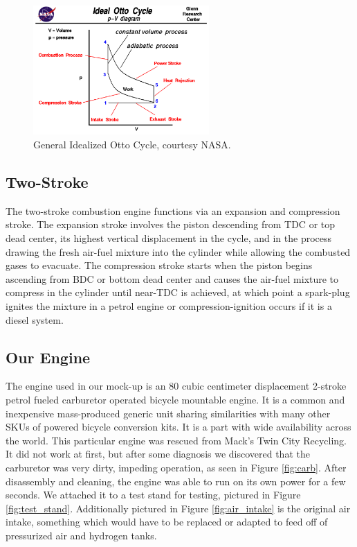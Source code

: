 \documentclass[conf]{new-aiaa}
\begin{document}
\begin{figure}[H]
    \centering
    \includegraphics[width=0.6\textwidth]{Screenshot 2023-04-24 170054.png}
    \caption{General Idealized Otto Cycle, courtesy NASA.\cite{nasa_otto}}
    \label{fig:otto_cycle}
\end{figure}


\subsection{Two-Stroke}
The two-stroke combustion engine functions via an expansion and compression stroke.  The expansion stroke involves the piston descending from TDC or top dead center, its highest vertical displacement in the cycle, and in the process drawing the fresh air-fuel mixture into the cylinder while allowing the combusted gases to evacuate.  The compression stroke starts when the piston begins ascending from BDC or bottom dead center and causes the air-fuel mixture to compress in the cylinder until near-TDC is achieved, at which point a spark-plug ignites the mixture in a petrol engine or compression-ignition occurs if it is a diesel system.
\subsection{Our Engine}

The engine used in our mock-up is an 80 cubic centimeter displacement 2-stroke petrol fueled carburetor operated bicycle mountable engine.  It is a common and inexpensive mass-produced generic unit sharing similarities with many other SKUs of powered bicycle conversion kits. It is a part with wide availability across the world. This particular engine was rescued from Mack's Twin City Recycling. It did not work at first, but after some diagnosis we discovered that the carburetor was very dirty, impeding operation, as seen in Figure \ref{fig:carb}. After disassembly and cleaning, the engine was able to run on its own power for a few seconds. We attached it to a test stand for testing, pictured in Figure \ref{fig:test_stand}. Additionally pictured in Figure \ref{fig:air_intake} is the original air intake, something which would have to be replaced or adapted to feed off of pressurized air and hydrogen tanks.
\end{document}
